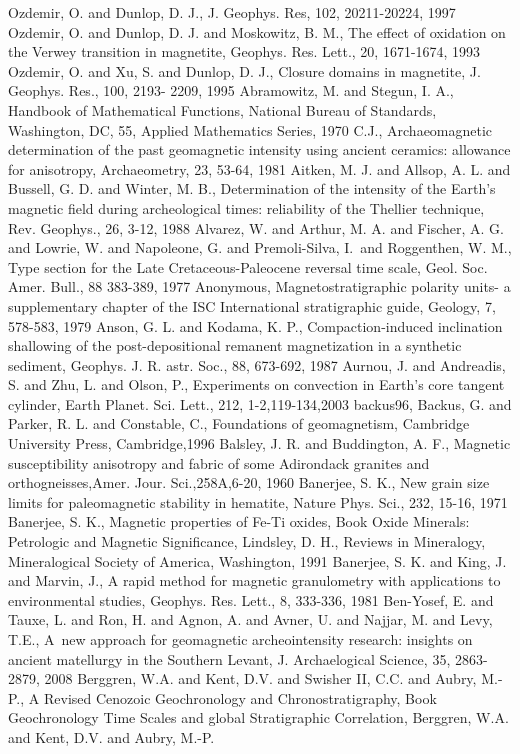 \documentclass[draft,plain]{tauxe}
\begin{document}
\begin{thebibliography}{}
\bibitem{} Ozdemir, O. and Dunlop, D. J., J. Geophys. Res, 102,
20211-20224, 1997
\bibitem{} Ozdemir, O. and Dunlop, D. J. and Moskowitz, B. M.,
The effect of oxidation on the Verwey transition
in magnetite, Geophys. Res. Lett., 20, 1671-1674,
1993
\bibitem{} Ozdemir, O. and Xu, S. and Dunlop, D. J., Closure
domains in magnetite, J. Geophys. Res., 100, 2193-
2209, 1995
\bibitem{} Abramowitz, M. and Stegun, I. A., Handbook of
Mathematical Functions, National Bureau of Standards,
Washington, DC, 55, Applied Mathematics
Series, 1970
\bibitem{} C.J., Archaeomagnetic determination of the past geomagnetic
intensity using ancient ceramics: allowance
for anisotropy, Archaeometry, 23, 53-64, 1981
\bibitem{} Aitken, M. J. and Allsop, A. L. and Bussell, G. D. and
Winter, M. B., Determination of the intensity of the
Earth's magnetic field during archeological times:
reliability of the Thellier technique, Rev. Geophys.,
26, 3-12, 1988
\bibitem{} Alvarez, W. and Arthur, M. A. and Fischer, A. G. and
Lowrie, W. and Napoleone, G. and Premoli-Silva,
I.~and Roggenthen, W. M., Type section for the Late
Cretaceous-Paleocene reversal time scale, Geol.
Soc. Amer. Bull., 88 383-389, 1977
\bibitem{} Anonymous, Magnetostratigraphic polarity units- a
supplementary chapter of the ISC International
stratigraphic guide, Geology, 7, 578-583, 1979
\bibitem{} Anson, G. L. and Kodama, K. P., Compaction-induced
inclination shallowing of the post-depositional
remanent magnetization in a synthetic sediment,
Geophys. J. R. astr. Soc., 88, 673-692, 1987
\bibitem{} Aurnou, J. and Andreadis, S. and Zhu, L. and Olson,
P., Experiments on convection in Earth's core
tangent cylinder, Earth Planet. Sci. Lett., 212,
1-2,119-134,2003
\bibitem{} backus96, Backus, G. and Parker, R. L. and Constable,
C., Foundations of geomagnetism, Cambridge
University Press, Cambridge,1996
\bibitem{} Balsley, J. R. and Buddington, A. F., Magnetic
susceptibility anisotropy and fabric of some Adirondack
granites and orthogneisses,Amer. Jour.
Sci.,258A,6-20, 1960
\bibitem{} Banerjee, S. K., New grain
size limits for paleomagnetic stability in hematite,
Nature Phys. Sci., 232, 15-16, 1971
Banerjee, S. K., Magnetic properties of Fe-Ti oxides,
Book Oxide Minerals: Petrologic and Magnetic
Significance, Lindsley, D. H., Reviews in Mineralogy,
Mineralogical Society of America, Washington, 1991
\bibitem{} Banerjee, S. K. and King, J. and Marvin, J., A rapid
method for magnetic granulometry with applications
to environmental studies, Geophys. Res. Lett.,
8, 333-336, 1981
\bibitem{} Ben-Yosef, E. and Tauxe, L. and Ron, H. and Agnon,
A. and Avner, U. and Najjar, M. and Levy, T.E.,
A~new approach for geomagnetic archeointensity
research: insights on ancient matellurgy in the
Southern Levant, J. Archaelogical Science, 35,
2863-2879, 2008
\bibitem{} Berggren, W.A. and Kent, D.V. and Swisher II, C.C.
and Aubry, M.-P., A Revised Cenozoic Geochronology
and Chronostratigraphy, Book Geochronology
Time Scales and global Stratigraphic Correlation,
Berggren, W.A. and Kent, D.V. and Aubry, M.-P.
\end{thebibliography}
\end{document}
